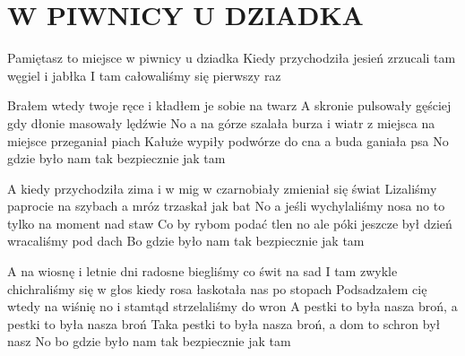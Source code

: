 \documentclass[../../../songbook.tex]{subfiles}
\begin{document}
\TabPositions{9cm} %
\section*{W PIWNICY U DZIADKA}
{}
\vspace{0.5cm}
Pamiętasz to miejsce w piwnicy u dziadka				 \newline
Kiedy przychodziła jesień zrzucali tam węgiel i jabłka	 \newline
I tam całowaliśmy się pierwszy raz						 \newline

Brałem wtedy twoje ręce i kładłem je sobie na twarz \newline
A skronie pulsowały gęściej gdy dłonie masowały lędźwie \newline
No a na górze szalała burza i wiatr z miejsca na miejsce przeganiał piach \newline
Kałuże wypiły podwórze do cna a buda ganiała psa \newline
No gdzie było nam tak bezpiecznie jak tam \newline

A kiedy przychodziła zima i w mig w czarnobiały zmieniał się świat \newline
Lizaliśmy paprocie na szybach a mróz trzaskał jak bat \newline
No a jeśli wychylaliśmy nosa no to tylko na moment nad staw \newline
Co by rybom podać tlen no ale póki jeszcze był dzień wracaliśmy pod dach \newline
Bo gdzie było nam tak bezpiecznie jak tam \newline

A na wiosnę i letnie dni radosne biegliśmy co świt na sad \newline
I tam zwykle chichraliśmy się w głos kiedy rosa łaskotała nas po stopach \newline
Podsadzałem cię wtedy na wiśnię no i stamtąd strzelaliśmy do wron \newline
A pestki to była nasza broń, a pestki to była nasza broń \newline
Taka pestki to była nasza broń, a dom to schron był nasz \newline
No bo gdzie było nam tak bezpiecznie jak tam \newline
\end{document}
